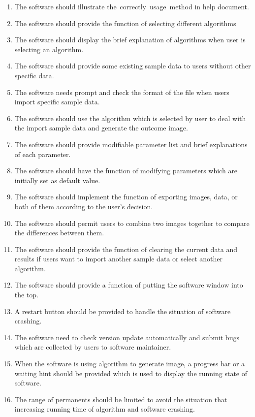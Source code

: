 \documentclass[11pt,oneside,a4paper]{article}
\begin{document}
\begin{enumerate}
  \item The software should illustrate the correctly usage method in help document.
  \item The software should provide the function of selecting different algorithms
  \item The software should display the brief explanation of algorithms when user is selecting an algorithm.
  \item The software should provide some existing sample data to users without other specific data.
  \item The software needs prompt and check the format of the file when users import specific sample data.
  \item The software should use the algorithm which is selected by user to deal with the import sample data and generate the outcome image.
  \item The software should provide modifiable parameter list and brief explanations of each parameter.
  \item The software should have the function of modifying parameters which are initially set as default value.
  \item The software should implement the function of exporting images, data, or both of them according to the user’s decision.
  \item The software should permit users to combine two images together to compare the differences between them.
  \item The software should provide the function of clearing the current data and results if users want to import another sample data or select another algorithm.
  \item The software should provide a function of putting the software window into the top.
  \item A restart button should be provided to handle the situation of software crashing.
  \item The software need to check version update automatically and submit bugs which are collected by users to software maintainer.
  \item When the software is using algorithm to generate image, a progress bar or a waiting hint should be provided which is used to display the running state of software.
  \item The range of permanents should be limited to avoid the situation that increasing running time of algorithm and software crashing.
\end{enumerate}
\end{document}
